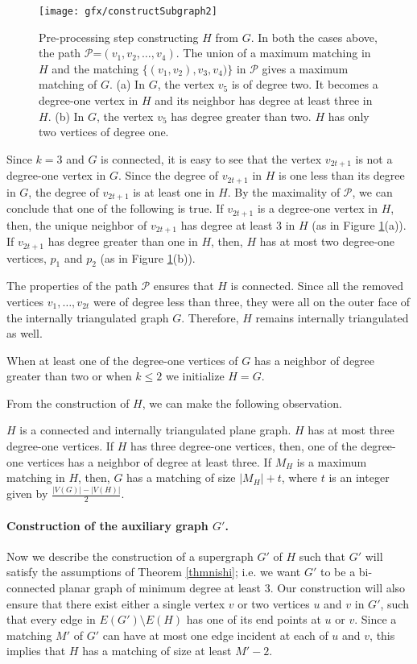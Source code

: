 \begin{figure}[h]
  \centering
  \texttt{[image: gfx/constructSubgraph2]}   %
  \caption[Pre-processing step constructing $H$ from $G$.]{Pre-processing step constructing $H$ from $G$. In both the cases above, the path $\mathcal{P}$=$(v_1, v_2, \ldots, v_{4})$. The union of a maximum matching in $H$ and the matching $\{(v_1, v_2), v_3, v_4)\}$ in $\mathcal{P}$ gives a maximum matching of $G$. (a) In $G$, the vertex $v_5$ is of degree two. It becomes a degree-one vertex in $H$ and its neighbor has degree at least three in $H$. (b) In $G$, the vertex $v_5$ has degree greater than two. $H$ has only two vertices of degree one.}
\label{figh1}
  \end{figure} 

Since $k=3$ and $G$ is connected, it is easy to see that the vertex $v_{2t+1}$ is not a degree-one vertex in $G$. Since the degree of $v_{2t+1}$ in 
$H$ is one less than its degree in $G$, the degree of $v_{2t+1}$ is at least one in $H$. By the maximality of $\mathcal{P}$, we can conclude that 
one of the following is true. If $v_{2t+1}$ is a degree-one vertex in $H$, then, the unique neighbor of $v_{2t+1}$ has degree at least $3$ in $H$ 
(as in Figure \ref{figh1}(a)). If $v_{2t+1}$ has degree greater than one in $H$, then, 
$H$ has at most two degree-one vertices, $p_1$ and $p_2$ (as in Figure \ref{figh1}(b)). 

The properties of the path $\mathcal{P}$ ensures that $H$ is connected. Since all the removed vertices $v_1, \ldots, v_{2t}$ were of degree less 
than three, they were all on the outer face of the internally triangulated graph $G$. Therefore, $H$ remains internally triangulated as well. 

When at least one of the degree-one vertices of $G$ has a neighbor of degree greater than two or when $k\le 2$ we initialize $H = G$. 

From the construction of $H$, we can make the following observation.
\begin{property}\label{subgraph}
 $H$ is a connected and internally triangulated plane graph. $H$ has at most three degree-one vertices. If $H$ has three degree-one vertices, 
then, one of the degree-one vertices has a neighbor of degree at least three. If $M_H$ is a maximum matching in $H$, then, $G$ has a matching of 
size $|M_H|+t$, where $t$ is an integer given by $\frac{|V(G)|-|V(H)|}{2}$. 
\end{property}
\paragraph{\textbf{Construction of the auxiliary graph $G'$.}}
Now we describe the construction of a supergraph $G'$ of $H$ such that $G'$ will satisfy the assumptions of Theorem \ref{thmnishi}; i.e. we want $G'$ 
to be a bi-connected planar graph of minimum degree at least $3$. Our construction will also ensure that there exist either a single vertex $v$ or two vertices $u$ and $v$ in $G'$, such that every edge in $E(G')\setminus E(H)$ has one of its end points at $u$ or $v$. Since a matching $M'$ of $G'$ 
can have at most one edge incident at each of $u$ and $v$, this implies that $H$ has a matching of size at least $M'-2$.

